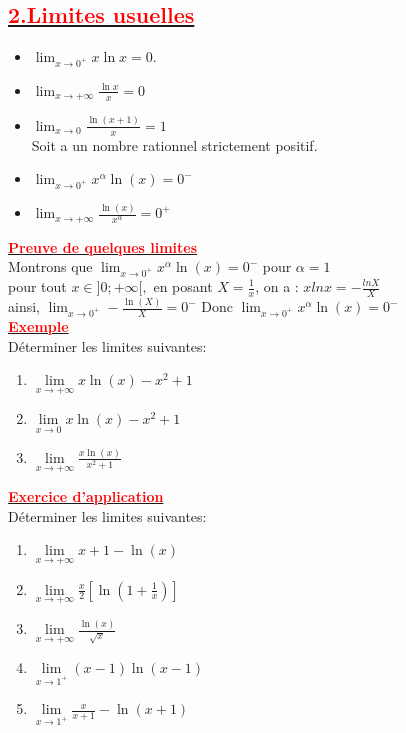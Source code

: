 \documentclass[12pt,a4paper]{article}
\begin{document}
\subsection*{\underline{\textbf{\textcolor{red}{2.Limites usuelles}}}}
\begin{itemize}
    \item $\lim_{x \to 0^+} x \ln x = 0$.
    \item $ \lim_{x \to +\infty} \frac{\ln x}{x} = 0 $
    \item $\lim_{{x \to 0}} \frac{\ln(x+1)}{x}=1$\\
Soit a un nombre rationnel strictement positif.
   \item $\lim_{{x \to 0^+}} x^{\alpha}\ln(x) = 0^{-} $
   \item $\lim_{{x \to +\infty}} \frac{\ln(x)}{x^{\alpha}}=0^{+}$
\end{itemize}
\underline{\textbf{\textcolor{red}{Preuve de quelques limites}}}\\
Montrons que $\lim_{{x \to 0^+}} x^{\alpha}\ln(x) = 0^{-}$ pour $\alpha=1$\\
pour tout $x\in]0;+\infty[,$ en posant $X=\frac{1}{x}$, on a : $xlnx=-\frac{lnX}{X}$\\
ainsi, $\lim_{{x \to 0^{+}}} -\frac{\ln(X)}{X}=0^{-}$
Donc $\lim_{{x \to 0^+}} x^{\alpha}\ln(x) = 0^{-}$\\
\underline{\textbf{\textcolor{red}{Exemple}}}\\

Déterminer les limites suivantes:
\begin{enumerate}
\item \( \lim\limits_{x \to +\infty} x\ln(x)-x^{2}+1\)

\item \( \lim\limits_{x \to 0} x\ln(x)-x^{2}+1\)

\item \( \lim\limits_{x \to +\infty} \frac{x\ln(x)}{x^{2}+1}\)
\end{enumerate}

\underline{\textbf{\textcolor{red}{Exercice d'application}}}\\
Déterminer les limites suivantes:

\begin{enumerate}
\item \( \lim\limits_{x \to +\infty} x+1-\ln(x)\)

\item \( \lim\limits_{x \to +\infty} \frac{x}{2}[\ln(1+\frac{1}{x})] \)

\item \( \lim\limits_{x \to +\infty} \frac{\ln(x)}{\sqrt{x}} \)

\item \( \lim\limits_{x \to 1^{+}} (x-1)\ln(x-1) \)

\item \( \lim\limits_{x \to 1^{+}} \frac{x}{x+1}-\ln(x+1) \)
\end{enumerate}
\end{document}
